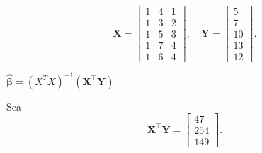 \documentclass[10pt,a4paper]{article}
\begin{document}
\begin{enumerate}
\[
\mathbf{X}
=
\begin{bmatrix}
1 & 4 & 1\\
1 & 3 & 2\\
1 & 5 & 3\\
1 & 7 & 4\\
1 & 6 & 4
\end{bmatrix},
\quad
\mathbf{Y}
=
\begin{bmatrix}
5\\
7\\
10\\
13\\
12
\end{bmatrix}.
\]



{$\hat{\boldsymbol{\beta}} = (X^TX)^{-1}(\mathbf{X}^\top \mathbf{Y})$}

Sea
\[
\mathbf{X}^\top \mathbf{Y}
=
\begin{bmatrix}
47\\
254\\
149
\end{bmatrix}.
\]


\end{enumerate}
\end{document}

